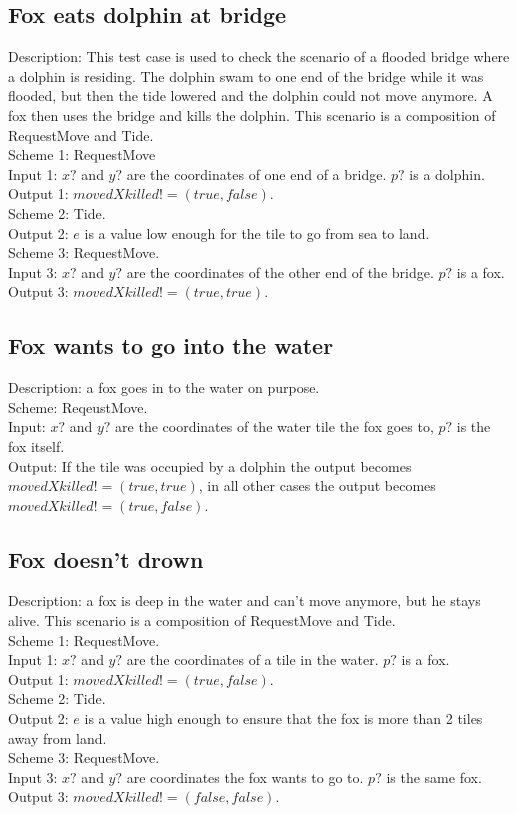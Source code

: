 \documentclass[a4paper,11pt]{article}
\begin{document}
    \subsection{Fox eats dolphin at bridge}
    Description: This test case is used to check the scenario of a flooded bridge where a dolphin is residing. The dolphin swam to one end of the bridge while it was flooded, but then the tide lowered and the dolphin could not move anymore. A fox then uses the bridge and kills the dolphin. This scenario is a composition of RequestMove and Tide.\\
    Scheme 1: RequestMove\\
    Input 1: $x?$ and $y?$ are the coordinates of one end of a bridge. $p?$ is a dolphin.\\
    Output 1: $movedXkilled! = (true,false)$.\\
    Scheme 2: Tide.\\
    Output 2: $e$ is a value low enough for the tile to go from sea to land.\\
    Scheme 3: RequestMove.\\
    Input 3: $x?$ and $y?$ are the coordinates of the other end of the bridge. $p?$ is a fox.\\
    Output 3: $movedXkilled! = (true,true)$.\\

    \subsection{Fox wants to go into the water}
    Description: a fox goes in to the water on purpose.\\
    Scheme: ReqeustMove.\\
    Input: $x?$ and $y?$ are the coordinates of the water tile the fox goes to, $p?$ is the fox itself.\\
    Output: If the tile was occupied by a dolphin the output becomes $movedXkilled! = (true,true)$, in all other cases the output becomes $movedXkilled! = (true,false)$.

    \subsection{Fox doesn't drown}
    Description: a fox is deep in the water and can't move anymore, but he stays alive. This scenario is a composition of RequestMove and Tide.\\
    Scheme 1: RequestMove.\\
    Input 1: $x?$ and $y?$ are the coordinates of a tile in the water. $p?$ is a fox.\\
    Output 1: $movedXkilled! = (true,false)$.\\
    Scheme 2: Tide.\\
    Output 2: $e$ is a value high enough to ensure that the fox is more than 2 tiles away from land.\\
    Scheme 3: RequestMove.\\
    Input 3: $x?$ and $y?$ are coordinates the fox wants to go to. $p?$ is the same fox.\\
    Output 3: $movedXkilled! = (false,false)$.\\
\end{document}
